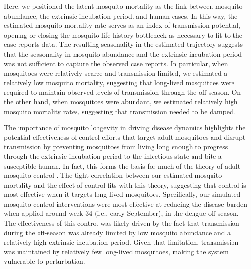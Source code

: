 \documentclass[10pt,letterpaper]{article}
\begin{document}
Here, we positioned the latent mosquito mortality as the link between mosquito abundance, the extrinsic incubation period, and human cases.
In this way, the estimated mosquito mortality rate serves as an index of transmission potential, opening or closing the mosquito life history bottleneck \cite{Smith2012} as necessary to fit to the case reports data.
The resulting seasonality in the estimated trajectory suggests that the seasonality in mosquito abundance and the extrinsic incubation period was not sufficient to capture the observed case reports.
In particular, when mosquitoes were relatively scarce and transmission limited, we estimated a  relatively low mosquito mortality, suggesting that long-lived mosquitoes were required to maintain observed levels of transmission through the off-season.  
On the other hand, when mosquitoes were abundant, we estimated relatively high mosquito mortality rates, suggesting that transmission needed to be damped.

The importance of mosquito longevity in driving disease dynamics highlights the potential effectiveness of control efforts that target adult mosquitoes and disrupt transmission by preventing mosquitoes from living long enough to progress through the extrinsic incubation period to the infectious state and bite a susceptible human.
In fact, this forms the basis for much of the theory of adult mosquito control \cite{Burattini2008, Morrison2008, Smith2012}.
The tight correlation between our estimated mosquito mortality and the effect of control fits with this theory, suggesting that control is most effective when it targets long-lived mosquitoes.  
Specifically, our simulated mosquito control interventions were most effective at reducing the disease burden when applied around week 34 (i.e., early September), in the dengue off-season.
The effectiveness of this control was likely driven by the fact that transmission during the off-season was already limited by low mosquito abundance and a relatively high extrinsic incubation period.
Given that limitation, transmission was maintained by relatively few long-lived mosquitoes, making the system vulnerable to perturbation.
\end{document}
